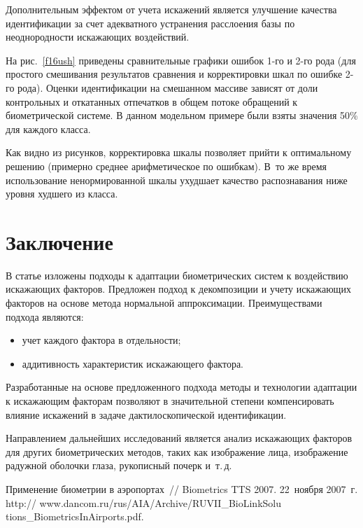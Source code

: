 \begin{multicols}{2}
    Дополнительным эффектом от учета искажений является улучшение качества 
идентификации за счет адекватного устранения расслоения базы по неоднородности 
искажающих воздействий.
     
     На рис.~\ref{f16ush} приведены сравнительные графики ошибок 
     1-го и 2-го рода (для простого смешивания результатов сравнения и 
корректировки шкал по ошибке 2-го рода). Оценки идентификации на смешанном 
массиве зависят от доли контрольных и откатанных отпечатков в общем потоке 
обращений к биометрической системе. В данном модельном примере были взяты 
значения 50\% для каждого класса.
     
     Как видно из рисунков, корректировка шкалы позволяет прийти к оптимальному 
решению (примерно среднее арифметическое по ошибкам). В~то же время 
использование ненормированной шкалы ухудшает качество распознавания ниже 
уровня худшего из класса.
     
     
\section{Заключение}
     
     В статье изложены подходы к адаптации биометрических систем к воздействию 
искажающих факторов. Предложен подход к декомпозиции и учету искажающих 
факторов на основе метода нормальной аппроксимации. Преимуществами подхода 
являются:
     \begin{itemize}
     \item учет каждого фактора в отдельности;
\item аддитивность характеристик искажающего фактора.
\end{itemize}

     Разработанные на основе предложенного подхода методы и технологии 
адаптации к ис\-ка\-жа\-ющим факторам позволяют в значительной степени 
компенсировать влияние искажений в задаче дактилоскопической идентификации.
     
     Направлением дальнейших исследований является анализ искажающих факторов 
для других биометрических методов, таких как изображение лица, изображение 
радужной оболочки глаза, рукописный почерк и~т.\,д. 

     
{\small\frenchspacing
{%
\begin{thebibliography}{99}    
     
Применение биометрии в аэропортах~// Biometrics TTS 2007. 22~ноября 2007~г. {\sf 
http:// www.dancom.ru/rus/AIA/Archive/RUVII\_BioLinkSolu tions\_BiometricsInAirports.pdf}.


\end{thebibliography}}}
\end{multicols}
